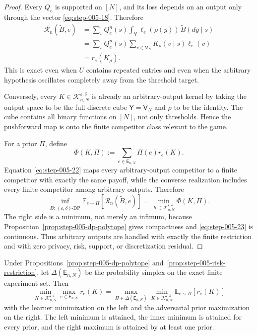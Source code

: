 \begin{proof}
Every \(Q_e\) is supported on \([N]\), and its loss depends on an output only through the vector \eqref{eq:step-005-18}. Therefore
\[
\begin{aligned}
\mathcal R_n(\widetilde B,e)
&=\sum_sQ_e^n(s)
\int_{\mathsf Y}\ell_e(\rho(y))\,\widetilde B(dy\mid s)\\
&=\sum_sQ_e^n(s)
\sum_{v\in\mathsf V_N}K_\rho(v\mid s)\ell_e(v)\\
&=r_e(K_\rho).
\end{aligned}
\tag{22}\label{eq:step-005-22}
\]
This is exact even when \(U\) contains repeated entries and even when the arbitrary hypothesis oscillates completely away from the threshold target.

Conversely, every \(K \in \mathcal K_{n,N}^{\varepsilon,\delta}\) is already an arbitrary-output kernel by taking the output space to be the full discrete cube
\(\mathsf Y=\mathsf V_N\) and \(\rho\) to be the identity. The cube contains all binary functions on \([N]\), not only thresholds. Hence the pushforward map is onto the finite competitor class relevant to the game.

For a prior \(\Pi\), define
\[
\Phi(K,\Pi)
:=\sum_{e\in\mathsf E_{n,N}}\Pi(e)r_e(K).
\tag{23}\label{eq:step-005-23}
\]
Equation \eqref{eq:step-005-22} maps every arbitrary-output competitor to a finite competitor with exactly the same payoff, while the converse realization includes every finite competitor among arbitrary outputs. Therefore
\[
\inf_{\widetilde B:\,(\varepsilon,\delta)\text{-DP}}
\mathbb E_{e\sim\Pi}[\mathcal R_n(\widetilde B,e)]
=
\min_{K\in\mathcal K_{n,N}^{\varepsilon,\delta}}
\Phi(K,\Pi).
\tag{24}\label{eq:step-005-24}
\]
The right side is a minimum, not merely an infimum, because Proposition~\ref{prop:step-005-dp-polytope} gives compactness and \eqref{eq:step-005-23} is continuous. Thus arbitrary outputs are handled with exactly the finite restriction and with zero privacy, risk, support, or discretization residual.

\end{proof}


\begin{proposition}
\label{prop:step-005-minimax}

Under Propositions~\ref{prop:step-005-dp-polytope} and~\ref{prop:step-005-risk-restriction}, let
\(\Delta(\mathsf E_{n,N})\) be the probability simplex on the exact finite experiment set. Then
\[
\boxed{
\min_{K\in\mathcal K_{n,N}^{\varepsilon,\delta}}
\max_{e\in\mathsf E_{n,N}}r_e(K)
=
\max_{\Pi\in\Delta(\mathsf E_{n,N})}
\min_{K\in\mathcal K_{n,N}^{\varepsilon,\delta}}
\mathbb E_{e\sim\Pi}[r_e(K)]
}
\tag{25}\label{eq:step-005-25}
\]
with the learner minimization on the left and the adversarial prior maximization on the right. The left minimum is attained, the inner minimum is attained for every prior, and the right maximum is attained by at least one prior.

\end{proposition}

